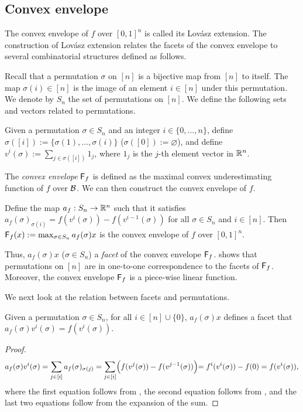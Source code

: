 \subsection{Convex envelope}
\label{sec.convexenvsub}
The convex envelope of $f$ over $[0,1]^n$ is  called its Lovász extension. The construction of  Lovász extension  relates the facets of the convex envelope to several combinatorial structures defined as follows.


Recall that a permutation $\sigma$ on $[n]$ is a bijective map from $[n]$ to itself. The map $\sigma(i) \in [n]$ is the image of   an element $i \in [n]$ under this permutation. We denote by $S_n$ the set of permutations on  $[n]$. We define the following sets and vectors related to permutations.

\begin{definition}
\label{def.perm}
 Given a permutation $\sigma \in S_n$ and an integer $i \in \{0, \ldots, n\}$, define $\sigma([i]) := \{\sigma(1),\ldots,\sigma(i)\}$ ($\sigma([0]) := \varnothing$), and  define $v^i(\sigma) := \sum_{j \in \sigma([i])} 1_j $, where $1_j$ is the $j$-th element vector in $\mathbb R^n$. 
\end{definition}



The \textit{convex envelope} ${\mathsf F}_f$ is defined as the maximal convex underestimating function of $f$ over $\mathcal B$.
We can then construct the convex envelope of $f$.

\begin{theorem}
\label{thm.sublovasz}
Define the map $a_f: S_n \to \mathbb R^n$ such that it satisfies $a_f(\sigma)_{\sigma(i)}= f(v^i(\sigma)) -f(v^{i-1}(\sigma))$  for all $\sigma \in S_n$ and $i \in [n]$. Then
${\mathsf F}_{f}(x):=\max_{\sigma \in S_n} a_f(\sigma) x$ is the convex envelope of $f$ over $[0,1]^n$.
\end{theorem}
Thus, $a_f(\sigma) x$ ($\sigma \in S_n$) a \emph{facet} of the convex envelope ${\mathsf F}_{f}$. 
shows that permutations on $[n]$ are in one-to-one correspondence to the facets of ${\mathsf F}_{f}$. Moreover, the  convex envelope ${\mathsf F}_{f}$ is a piece-wise linear function.  


We next look at the relation between facets and permutations.
 
 \begin{corollary}
 \label{prop.supportpoint}
Given a permutation $\sigma \in S_n$, for all $i \in [n] \cup \{0\}$, $a_f(\sigma) x $ defines a facet that $a_f(\sigma) v^i(\sigma) = f(v^i(\sigma))$.
\end{corollary}
\begin{proof}
\begin{equation*}
    a_f(\sigma)v^i(\sigma) = \sum_{ j \in [i] } a_f(\sigma)_{\sigma(j)}
    = \sum_{ j \in [i] } \Bigl( f(v^j(\sigma)) -f(v^{j-1}(\sigma)) \Bigl)
	 = f^i(v^i(\sigma))  - f(0)
    = f(v^i(\sigma))
,\end{equation*}
 where the first equation follows from , the second equation follows from , and the last two equations follow from the expansion of the sum.
\end{proof}
 
